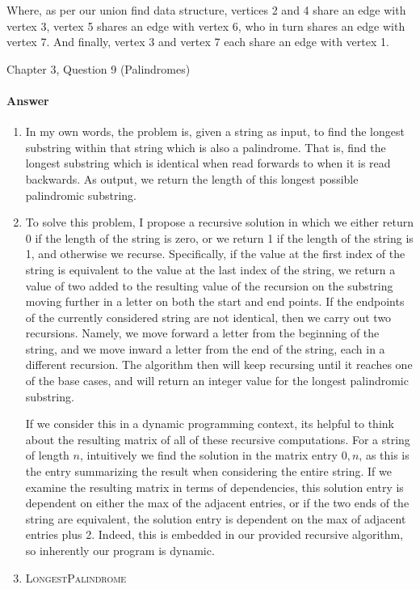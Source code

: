 \documentclass{article}
\begin{document}
Where, as per our union find data structure, vertices 2 and 4 share an edge 
with vertex 3, vertex 5 shares an edge with vertex 6, who in turn shares an 
edge with vertex 7. And finally, vertex 3 and vertex 7 each share an edge 
with vertex 1.

\nextprob
{}

Chapter 3, Question 9 (Palindromes)

\paragraph{Answer}


\begin{enumerate}
	\item In my own words, the problem is, given a string as input,
		to find the longest substring within that string which
		is also a palindrome. That is, find the longest substring
		which is identical when read forwards to when it is read 
		backwards. As output, we return the length of this longest
		possible palindromic substring.
	\item To solve this problem, I propose a recursive solution in which
		we either return 0 if the length of the string is zero, or we
		return 1 if the length of the string is 1, and otherwise
		we recurse. Specifically, if the value at the first index of 
		the string is equivalent to the value at the last index of
		the string, we return a value of two added to the resulting
		value of the recursion on the substring moving further in a
		letter on both the start and end points. If the endpoints
		of the currently considered string are not identical, then 
		we carry out two recursions. Namely, we move forward a letter
		from the beginning of the string, and we move inward a letter
		from the end of the string, each in a different recursion. 
		The algorithm then will keep recursing until it reaches one
		of the base cases, and will return an integer value for the 
		longest palindromic substring. 

		If we consider this in a dynamic programming context, its
		helpful to think about the resulting matrix of all
		of these recursive computations. For a string of length $n$,
		intuitively we find the solution in the matrix entry $0,n$,
		as this is the entry summarizing the result when considering
		the entire string. If we examine the resulting matrix in
		terms of dependencies, this solution entry is dependent on
		either the max of the adjacent entries, or if the two ends of
		the string are equivalent, the solution entry is dependent
		on the max of adjacent entries plus 2. Indeed, this is
		embedded in our provided recursive algorithm, so inherently
		our program is dynamic.
	\item 
		\begin{algorithm}
			\begin{algorithmic}
				\caption{\textsc{LongestPalindrome}}
				\STATE {} 
			\end{algorithmic}
		\end{algorithm}
 

\end{enumerate}
\end{document}
